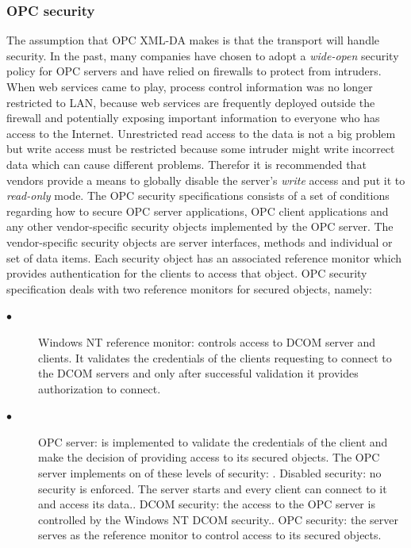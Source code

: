 \documentclass[twosided,a4,10pt]{article}
\begin{document}
\begin{multicols}{2}
	\subsubsection{OPC security}
	The assumption that OPC XML-DA makes is that the transport will handle security. In the past, many companies have chosen to adopt a \textit{wide-open} security policy for OPC servers and have relied on firewalls to protect from intruders. When web services came to play, process control information was no longer restricted to LAN, because web services are frequently deployed outside the firewall and potentially exposing important information to everyone who has access to the Internet. \newline
	Unrestricted read access to the data is not a big problem but write access must be restricted because some intruder might write incorrect data which can cause different problems. Therefor it is recommended that vendors provide a means to globally disable the server's \textit{write} access and put it to \textit{read-only} mode.\newline
	The OPC security specifications consists of a set of conditions regarding how to secure OPC server applications, OPC client applications and any other vendor-specific security objects implemented by the OPC server. The vendor-specific security objects are server interfaces, methods and individual or set of data items. Each security object has an associated reference monitor which provides authentication for the clients to access that object. OPC security specification deals with two reference monitors for secured objects, namely:
	\begin{description}
	\item[$\bullet$]
	Windows NT reference monitor: controls access to DCOM server and clients. It validates the credentials of the clients requesting to connect to the DCOM servers and only after successful validation it provides authorization to connect.
	\item[$\bullet$]
	OPC server: is implemented to validate the credentials of the client and make the decision of providing access to its secured objects. The OPC server implements on of these levels of security: . Disabled security: no security is enforced. The server starts and every client can connect to it and access its data.. DCOM security: the access to the OPC server is controlled by the Windows NT DCOM security.. OPC security: the server serves as the reference monitor to control access to its secured objects.
	\end{description}
	

\end{multicols}
\end{document}
